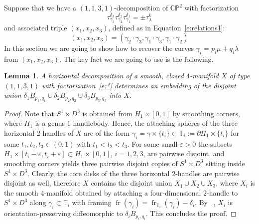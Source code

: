 \documentclass[11pt,a4paper]{amsart}
\newcommand{\CP}{\mathbb{CP}}
\newcommand{\TT}{\mathbb T}
\newcommand{\de}{\delta}
\newcommand{\ep}{\varepsilon}
\newcommand{\ga}{\gamma}
\newcommand{\la}{\lambda}
\newcommand{\x}{\times}
\newcommand{\del}{\partial}
\DeclareMathOperator{\fr}{fr}
\newtheorem{lemma}[thm]{Lemma}
\theoremstyle{definition}
\numberwithin{equation}{section}
\begin{document}
Suppose that we have a $(1,1,3,1)$-decomposition of $\CP^2$ with factorization 
\begin{equation}\label{e:*}%
\tau^{\de_3}_{\gamma_3} \tau^{\de_2}_{\gamma_2} \tau^{\de_1}_{\gamma_1}=\pm \tau_\la^k 
\end{equation} 
and associated triple $(x_1,x_2,x_3)$, defined as in Equation~\eqref{e:relations1}: 
\begin{equation*}
(x_1,x_2,x_3) = (\ga_2\cdot\ga_3, \ga_1\cdot\ga_3,\ga_1\cdot\ga_2) 
\end{equation*}
In this section we are going to show how to recover the curves $\ga_i=p_i \mu + q_i \la$ from $(x_1,x_2,x_3)$. The key fact we are going to use is the following. 
\begin{lemma}\label{l:disballs}
A horizontal decomposition of a smooth, closed $4$-manifold $X$ of type $(1,1,3,1)$ with factorization~\eqref{e:*} determines an embedding of the disjoint union $\de_1 B_{p_1,q_1}\cup\de_2 B_{p_2,q_2}\cup\de_3 B_{p_3,q_3}$ into $X$. 
\end{lemma}

\begin{proof}
Note that $S^1\x D^3$ is obtained from $H_1\x [0,1]$ by smoothing corners, where $H_1$ is a genus-$1$ handlebody. 
Hence, the attaching spheres of the three horizontal $2$-handles of $X$ are of the form 
$\ga_i = \ga\x\{t_i\}\subset\TT_i:=\del H_1\x\{t_i\}$ for some $t_1, t_2, t_3\in (0,1)$ with $t_1<t_2<t_3$. 
For some small $\ep>0$ the subsets $H_1\x [t_i-\ep,t_i+\ep]\subset H_1\x [0,1]$, $i=1,2,3$, 
are pairwise disjoint, and smoothing corners yields three pairwise disjoint copies of $S^1\x D^3$ sitting inside $S^1\x D^3$.
Clearly, the core disks of the three horizontal $2$-handles are pairwise disjoint as well, therefore $X$ contains the disjoint union 
$X_1\cup X_2\cup X_3$, where $X_i$ is the smooth $4$-manifold obtained by attaching a four-dimensional $2$-handle to $S^1\x D^3$ 
along $\ga_i\subset\TT_i$ with framing $\fr(\ga_i)=\fr_{\TT_i}(\ga_i) - \de_i$. 
By ~\cite[Proposition~3.2]{LP22-2}, $X_i$ is orientation-preserving diffeomorphic to $\de_i B_{p_i,q_i}$. 
This concludes the proof. 
\end{proof}
\end{document}
